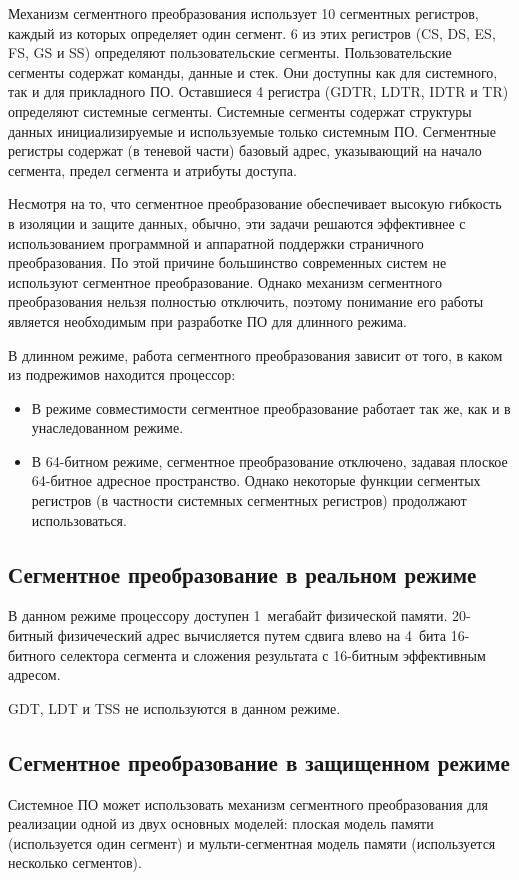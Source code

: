 Механизм сегментного преобразования использует 10 сегментных регистров, каждый из которых
определяет один сегмент. 6 из этих регистров (CS, DS, ES, FS, GS и SS) определяют пользовательские сегменты.
Пользовательские сегменты содержат команды, данные и стек. Они доступны как для системного, так и для прикладного ПО.
Оставшиеся 4 регистра (GDTR, LDTR, IDTR и TR) определяют системные сегменты. Системные сегменты содержат структуры
данных инициализируемые и используемые только системным ПО. Сегментные регистры содержат (в теневой части)
базовый адрес, указывающий на начало сегмента, предел сегмента и атрибуты доступа.

Несмотря на то, что сегментное преобразование обеспечивает высокую гибкость в изоляции и защите данных,
обычно, эти задачи решаются эффективнее с использованием программной и аппаратной
поддержки страничного преобразования. По этой причине большинство современных систем не используют сегментное преобразование.
Однако механизм сегментного преобразования нельзя полностью отключить, поэтому понимание его работы
является необходимым при разработке ПО для длинного режима.

В длинном режиме, работа сегментного преобразования зависит от того, в каком из подрежимов находится процессор:
\begin{itemize}
\item В режиме совместимости сегментное преобразование работает так же, как и в унаследованном режиме.
\item В 64-битном режиме, сегментное преобразование отключено, задавая плоское 64-битное адресное пространство.
	Однако некоторые функции сегментых регистров (в частности системных сегментных регистров) продолжают использоваться.
\end{itemize}

\subsection{Сегментное преобразование в реальном режиме}
В данном режиме процессору доступен 1~мегабайт физической памяти. 20-битный физичеческий адрес вычисляется
путем сдвига влево на 4~бита 16-битного селектора сегмента и сложения результата с 16-битным эффективным адресом.

GDT, LDT и TSS не используются в данном режиме.

\subsection{Сегментное преобразование в защищенном режиме}
Системное ПО может использовать механизм сегментного преобразования для реализации одной из двух основных
моделей: плоская модель памяти (используется один сегмент) и мульти-сегментная модель памяти
(используется несколько сегментов).

